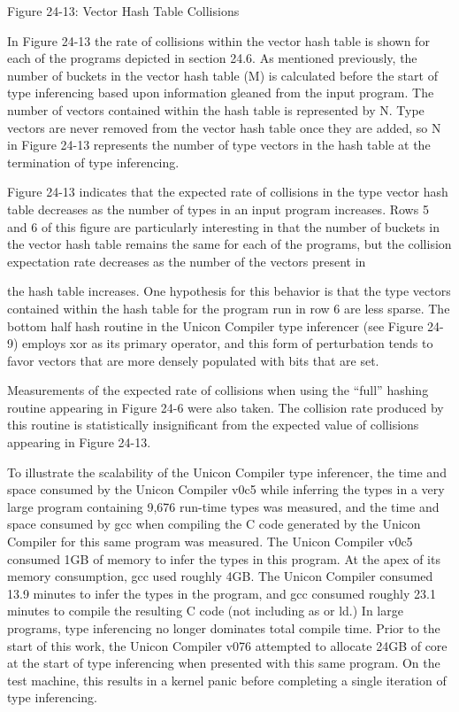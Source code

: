 {{\bigskip

Figure 24-13: Vector Hash Table Collisions
\par}


\bigskip

In Figure 24-13 the rate of collisions within the vector hash table is
shown for each of the programs depicted in section 24.6. As
mentioned previously, the number of buckets in the vector hash table
(M) is calculated before the start of type inferencing based upon
information gleaned from the input program. The number of vectors
contained within the hash table is represented by N. Type vectors are
never removed from the vector hash table once they are added, so N in
Figure 24-13 represents the number of type vectors in the hash table at
the termination of type inferencing.

Figure 24-13 indicates that the expected rate of collisions in the type
vector hash table decreases as the number of types in an input program
increases. Rows 5 and 6 of this figure are particularly interesting in
that the number of buckets in the vector hash table remains the same
for each of the programs, but the collision expectation rate decreases
as the number of the vectors present in }{the hash table
increases. One hypothesis for this behavior is that the type vectors
contained within the hash table for the program run in row 6 are less
sparse. The bottom half hash routine in the Unicon Compiler type
inferencer (see Figure 24-9) employs {\textsf{xor}} as its primary
operator, and this form of perturbation tends to favor vectors that
are more densely populated with bits that are set.

Measurements of the expected rate of collisions when using the
``full'' hashing routine appearing in Figure 24-6 were also taken. The
collision rate produced by this routine is statistically insignificant
from the expected value of collisions appearing in Figure 24-13.

To illustrate the scalability of the Unicon Compiler type inferencer,
the time and space consumed by the Unicon Compiler v0c5 while
inferring the types in a very large program containing 9,676 run-time
types was measured, and the time and space consumed by gcc when
compiling the C code generated by the Unicon Compiler for this same
program was measured.  The Unicon Compiler v0c5 consumed 1GB of memory
to infer the types in this program. At the apex of its memory
consumption, gcc used roughly 4GB. The Unicon Compiler consumed 13.9
minutes to infer the types in the program, and gcc consumed roughly
23.1 minutes to compile the resulting C code (not including as or ld.)
In large programs, type inferencing no longer dominates total compile
time. Prior to the start of this work, the Unicon Compiler v076
attempted to allocate 24GB of core at the start of type inferencing
when presented with this same program. On the test machine, this
results in a kernel panic before completing a single iteration of type
inferencing.

}
